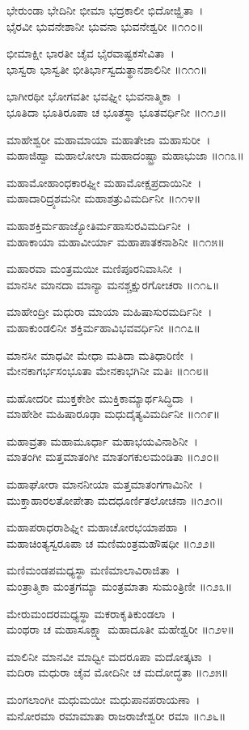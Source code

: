 ಭೇರುಂಡಾ ಭೇದಿನೀ ಭೀಮಾ ಭದ್ರಕಾಲೀ ಭಿದೋಜ್ಝಿತಾ~।\\
ಭೈರವೀ ಭುವನೇಶಾನೀ ಭುವನಾ ಭುವನೇಶ್ವರೀ ॥೧೧೦॥

ಭೀಮಾಕ್ಷೀ ಭಾರತೀ ಚೈವ ಭೈರವಾಷ್ಟಕಸೇವಿತಾ~।\\
ಭಾಸ್ವರಾ ಭಾಸ್ವತೀ ಭೀತಿರ್ಭಾಸ್ವದುತ್ಥಾನಶಾಲಿನೀ ॥೧೧೧॥

ಭಾಗೀರಥೀ ಭೋಗವತೀ ಭವಘ್ನೀ ಭುವನಾತ್ಮಿಕಾ~।\\
ಭೂತಿದಾ ಭೂತಿರೂಪಾ ಚ ಭೂತಸ್ಥಾ ಭೂತವರ್ಧಿನೀ ॥೧೧೨॥

ಮಾಹೇಶ್ವರೀ ಮಹಾಮಾಯಾ ಮಹಾತೇಜಾ ಮಹಾಸುರೀ~।\\
ಮಹಾಜಿಹ್ವಾ ಮಹಾಲೋಲಾ ಮಹಾದಂಷ್ಟ್ರಾ ಮಹಾಭುಜಾ ॥೧೧೩॥

ಮಹಾಮೋಹಾಂಧಕಾರಘ್ನೀ ಮಹಾಮೋಕ್ಷಪ್ರದಾಯಿನೀ~।\\
ಮಹಾದಾರಿದ್ರ್ಯಶಮನೀ ಮಹಾಶತ್ರುವಿಮರ್ದಿನೀ ॥೧೧೪॥

ಮಹಾಶಕ್ತಿರ್ಮಹಾಜ್ಯೋತಿರ್ಮಹಾಸುರವಿಮರ್ದಿನೀ~।\\
ಮಹಾಕಾಯಾ ಮಹಾವೀರ್ಯಾ ಮಹಾಪಾತಕನಾಶಿನೀ ॥೧೧೫॥

ಮಹಾರವಾ ಮಂತ್ರಮಯೀ ಮಣಿಪೂರನಿವಾಸಿನೀ~।\\
ಮಾನಸೀ ಮಾನದಾ ಮಾನ್ಯಾ ಮನಶ್ಚಕ್ಷುರಗೋಚರಾ ॥೧೧೬॥

ಮಾಹೇಂದ್ರೀ ಮಧುರಾ ಮಾಯಾ ಮಹಿಷಾಸುರಮರ್ದಿನೀ~।\\
ಮಹಾಕುಂಡಲಿನೀ ಶಕ್ತಿರ್ಮಹಾವಿಭವವರ್ಧಿನೀ ॥೧೧೭॥

ಮಾನಸೀ ಮಾಧವೀ ಮೇಧಾ ಮತಿದಾ ಮತಿಧಾರಿಣೀ~।\\
ಮೇನಕಾಗರ್ಭಸಂಭೂತಾ ಮೇನಕಾಭಗಿನೀ ಮತಿಃ ॥೧೧೮॥

ಮಹೋದರೀ ಮುಕ್ತಕೇಶೀ ಮುಕ್ತಿಕಾಮ್ಯಾರ್ಥಸಿದ್ಧಿದಾ~।\\
ಮಾಹೇಶೀ ಮಹಿಷಾರೂಢಾ ಮಧುದೈತ್ಯವಿಮರ್ದಿನೀ ॥೧೧೯॥

ಮಹಾವ್ರತಾ ಮಹಾಮೂರ್ಧಾ ಮಹಾಭಯವಿನಾಶಿನೀ~।\\
ಮಾತಂಗೀ ಮತ್ತಮಾತಂಗೀ ಮಾತಂಗಕುಲಮಂಡಿತಾ ॥೧೨೦॥

ಮಹಾಘೋರಾ ಮಾನನೀಯಾ ಮತ್ತಮಾತಂಗಗಾಮಿನೀ~।\\
ಮುಕ್ತಾಹಾರಲತೋಪೇತಾ ಮದಧೂರ್ಣಿತಲೋಚನಾ ॥೧೨೧॥

ಮಹಾಪರಾಧರಾಶಿಘ್ನೀ ಮಹಾಚೋರಭಯಾಪಹಾ~।\\
ಮಹಾಚಿಂತ್ಯಸ್ವರೂಪಾ ಚ ಮಣಿಮಂತ್ರಮಹೌಷಧೀ ॥೧೨೨॥

ಮಣಿಮಂಡಪಮಧ್ಯಸ್ಥಾ ಮಣಿಮಾಲಾವಿರಾಜಿತಾ~।\\
ಮಂತ್ರಾತ್ಮಿಕಾ ಮಂತ್ರಗಮ್ಯಾ ಮಂತ್ರಮಾತಾ ಸುಮಂತ್ರಿಣೀ ॥೧೨೩॥

ಮೇರುಮಂದರಮಧ್ಯಸ್ಥಾ ಮಕರಾಕೃತಿಕುಂಡಲಾ~।\\
ಮಂಥರಾ ಚ ಮಹಾಸೂಕ್ಷ್ಮಾ ಮಹಾದೂತೀ ಮಹೇಶ್ವರೀ ॥೧೨೪॥

ಮಾಲಿನೀ ಮಾನವೀ ಮಾಧ್ವೀ ಮದರೂಪಾ ಮದೋತ್ಕಟಾ~।\\
ಮದಿರಾ ಮಧುರಾ ಚೈವ ಮೋದಿನೀ ಚ ಮದೋದ್ಧತಾ ॥೧೨೫॥

ಮಂಗಲಾಂಗೀ ಮಧುಮಯೀ ಮಧುಪಾನಪರಾಯಣಾ~।\\
ಮನೋರಮಾ ರಮಾಮಾತಾ ರಾಜರಾಜೇಶ್ವರೀ ರಮಾ ॥೧೨೬॥

